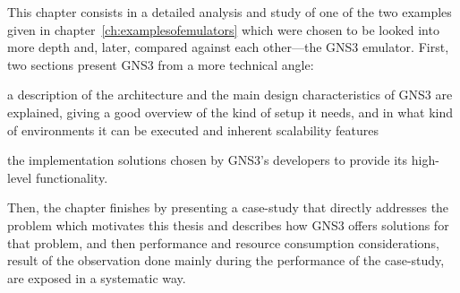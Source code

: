 

This chapter consists in a detailed analysis and study of one of the two examples given in chapter~\ref{ch:examplesofemulators} which were chosen to be looked into more depth and, later, compared against each other---the GNS3 emulator.
First, two sections present GNS3 from a more technical angle:
  \begin{enumerate*}[label=(\roman*), itemjoin={{, }}, itemjoin*={{, and }}]
  \item a description of the architecture and the main design characteristics of GNS3 are explained, giving a good overview of the kind of setup it needs, and in what kind of environments it can be executed and inherent scalability features
  \item the implementation solutions chosen by GNS3's developers to provide its high-level functionality.
  \end{enumerate*}
Then, the chapter finishes by presenting a case-study that directly addresses the problem which motivates this thesis and describes how GNS3 offers solutions for that problem, and then performance and resource consumption considerations, result of the observation done mainly during the performance of the case-study, are exposed in a systematic way.







